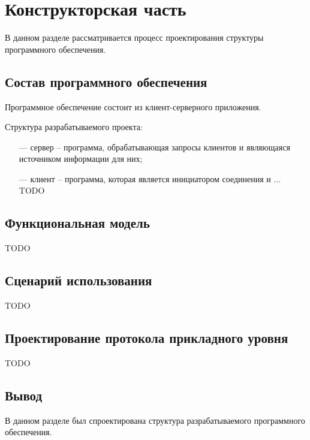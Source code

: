 \chapter{Конструкторская часть}

В данном разделе рассматривается процесс проектирования структуры программного обеспечения.

\section{Состав программного обеспечения}

Программное обеспечение состоит из клиент-серверного приложения.

Структура разрабатываемого проекта:

\begin{itemize}
	\item[---] сервер -- программа, обрабатывающая запросы клиентов и являющаяся источником информации для них;
	\item[---] клиент -- программа, которая является инициатором соединения и ... TODO
\end{itemize}

\section{Функциональная модель}

TODO

\section{Сценарий использования}

TODO

\section{Проектирование протокола прикладного уровня}

TODO

\section*{Вывод}

В данном разделе был спроектирована структура разрабатываемого программного обеспечения.


